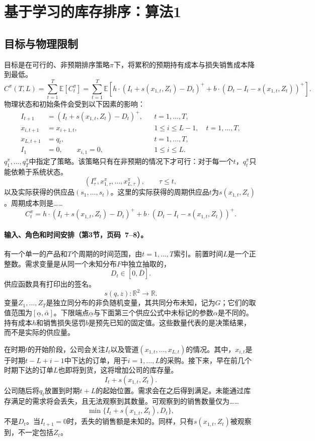 \documentclass{article}
\begin{document}
\section*{基于学习的库存排序：算法1}

\subsection*{目标与物理限制}
目标是在可行的、非预期排序策略\(\pi\)下，将累积的预期持有成本与损失销售成本降到最低。
\begin{equation}
C^{\pi}(T,L)=\sum_{t=1}^{T}\mathbb{E}[C_t^{\pi}]
=\sum_{t=1}^{T}\mathbb{E}\left[
 h\cdot(I_t+s(x_{1,t},Z_t)-D_t)^+
 +b\cdot(D_t-I_t-s(x_{1,t},Z_t))^+
\right].\tag{1}
\end{equation}
物理状态和初始条件会受到以下因素的影响：
\begin{align*}
I_{t+1}&=(I_t+s(x_{1,t},Z_t)-D_t)^+,
&&t=1,\ldots,T,\\
x_{i,t+1}&=x_{i+1,t},
&&1\leq i\leq L-1,\quad t=1,\ldots,T,\\
x_{L,t+1}&=q_t,
&&t=1,\ldots,T,\\
I_1&=0,\qquad x_{i,1}=0,
&&1\leq i\leq L.
\end{align*}
\(q_1^\pi,\ldots,q_T^\pi\)中指定了策略。该策略只有在非预期的情况下才可行：对于每一个\(t\)，\(q_t^\pi\)只能依赖于系统状态。
\[
(I_\tau^\pi,x_{1,\tau}^\pi,\ldots,x_{L,\tau}^\pi),\qquad \tau\leq t,
\]
以及实际获得的供应品\((s_1,\ldots,s_t)\)。这里的实际获得的周期供应品\(t\)为\(s(x_{1,t},Z_t)\)。周期成本则是……
\[
C_t^\pi=h\cdot(I_t+s(x_{1,t},Z_t)-D_t)^+
+b\cdot(D_t-I_t-s(x_{1,t},Z_t))^+.
\]

\paragraph{输入、角色和时间安排（第3节，页码\ 7–8）。}
有一个单一的产品和\(T\)个周期的时间范围，由\(t=1,\ldots,T\)索引。前置时间\(L\)是一个正整数。需求变量是从同一个未知分布\(F\)中独立抽取的，
\[
D_t\in[0,\bar D].
\]
供应函数具有打印出的签名。
\[
s(q,z):\mathbb{R}^2\longrightarrow\mathbb{R}.
\]
变量\(Z_1,\ldots,Z_T\)是独立同分布的非负随机变量，其共同分布未知，记为\(G\)；它们的取值范围为\([\underline\alpha,\bar\alpha]\)。下限端点\(\underline\alpha\)与下面第三个供应公式中未标记的参数\(\alpha\)是不同的。持有成本\(h\)和销售损失惩罚\(b\)是预先已知的固定值。这些数量代表的是决策结果，而不是实际的供应量。

在时期\(t\)的开始阶段，公司会关注\(I_t\)以及管道\((x_{1,t},\ldots,x_{L,t})\)的情况。其中，\(x_{i,t}\)是于时期\(t-L+i-1\)中下达的订单，用于\(i=1,\ldots,L\)的采购。接下来，早在前几个时期下达的订单\(L\)也即将到货，这将增加公司的库存量。
\[
I_t+s(x_{1,t},Z_t).
\]
公司随后将\(q_t\)放置到时期\(t+L\)的起始位置。需求会在之后得到满足。未能通过库存满足的需求将会丢失，且无法观察到其数量。可观察到的销售数量仅为……
\[
\min\{I_t+s(x_{1,t},Z_t),D_t\},
\]
不是\(D_t\)。当\(I_{t+1}=0\)时，丢失的销售额是未知的。同样，只有\(s(x_{1,t},Z_t)\)被观察到，不一定包括\(Z_t\)。
\end{document}
